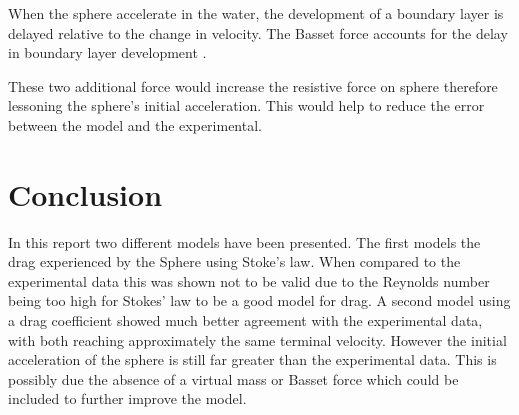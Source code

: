 \documentclass[10pt,a4paper, twocolumn]{article}
\begin{document}
	When the sphere accelerate in the water, the development of a boundary layer is delayed relative to the change in velocity. The Basset force accounts for the delay in boundary layer development \cite{Crowe2011}.
	
	These two additional force would increase the resistive force on sphere therefore lessoning the sphere's initial acceleration. This would help to reduce the error between the model and the experimental.
	
	\section{Conclusion}
	
	In this report two different models have been presented. The first models the drag experienced by the Sphere using Stoke's law. When compared to the experimental data this was shown not to be valid due to the Reynolds number being too high for Stokes' law to be a good model for drag. A second model using a drag coefficient showed much better agreement with the experimental data, with both reaching approximately the same terminal velocity. However the initial acceleration of the sphere is still far greater than the experimental data. This is possibly due the absence of a virtual mass or Basset force which could be included to further improve the model.
	
	
	\printbibliography
	
\end{document}
